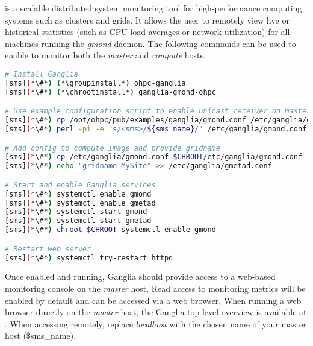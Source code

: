 \Ganglia{} is a scalable distributed system monitoring tool for high-performance
computing systems such as clusters and grids. It allows the user to remotely
view live or historical statistics (such as CPU load averages or network
utilization) for all machines running the {\em gmond} daemon. The following 
commands can be used to enable \Ganglia{} to monitor both the {\em master} and 
{\em compute} hosts.

\begin{lstlisting}[language=bash,keywords={},upquote=true]
# Install Ganglia
[sms](*\#*) (*\groupinstall*) ohpc-ganglia
[sms](*\#*) (*\chrootinstall*) ganglia-gmond-ohpc

# Use example configuration script to enable unicast receiver on master host
[sms](*\#*) cp /opt/ohpc/pub/examples/ganglia/gmond.conf /etc/ganglia/gmond.conf
[sms](*\#*) perl -pi -e "s/<sms>/${sms_name}/" /etc/ganglia/gmond.conf

# Add config to compute image and provide gridname 
[sms](*\#*) cp /etc/ganglia/gmond.conf $CHROOT/etc/ganglia/gmond.conf
[sms](*\#*) echo "gridname MySite" >> /etc/ganglia/gmetad.conf

# Start and enable Ganglia services
[sms](*\#*) systemctl enable gmond
[sms](*\#*) systemctl enable gmetad
[sms](*\#*) systemctl start gmond
[sms](*\#*) systemctl start gmetad
[sms](*\#*) chroot $CHROOT systemctl enable gmond

# Restart web server
[sms](*\#*) systemctl try-restart httpd
\end{lstlisting}

Once enabled and running, Ganglia should provide access to a web-based
monitoring console on the {\em master} host. Read access to monitoring metrics
will be enabled by default and can be accessed via a web browser. When running
a web browser directly on the {\em master} host, the Ganglia top-level overview
is available
at \href{http://localhost/ganglia}{\color{blue}{http://localhost/ganglia}}.
When accessing remotely, replace {\em localhost} with the chosen name of your
master host (\${sms\_name}).


